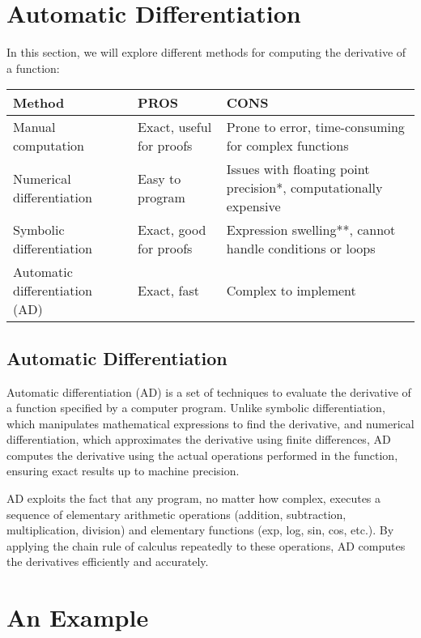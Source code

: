 \section{Automatic Differentiation}

In this section, we will explore different methods for computing the derivative of a function:

\begin{center}
\begin{tabular}{|| m{14em} | m{12em} | m{20em} ||} 
 \hline
 Method & PROS & CONS \\ [0.5ex] 
 \hline\hline
 Manual computation & Exact, useful for proofs & Prone to error, time-consuming for complex functions\\ 
 \hline
 Numerical differentiation & Easy to program & Issues with floating point precision*, computationally expensive\\
 \hline
 Symbolic differentiation & Exact, good for proofs & Expression swelling**, cannot handle conditions or loops \\ 
 \hline
 Automatic differentiation (AD) & Exact, fast & Complex to implement \\ 
 \hline
\end{tabular}
\end{center}

\subsection*{Automatic Differentiation}

Automatic differentiation (AD) is a set of techniques to evaluate the derivative of a function specified by a computer program. Unlike symbolic differentiation, which manipulates mathematical expressions to find the derivative, and numerical differentiation, which approximates the derivative using finite differences, AD computes the derivative using the actual operations performed in the function, ensuring exact results up to machine precision.

AD exploits the fact that any program, no matter how complex, executes a sequence of elementary arithmetic operations (addition, subtraction, multiplication, division) and elementary functions (exp, log, sin, cos, etc.). By applying the chain rule of calculus repeatedly to these operations, AD computes the derivatives efficiently and accurately.



\section*{An Example}

